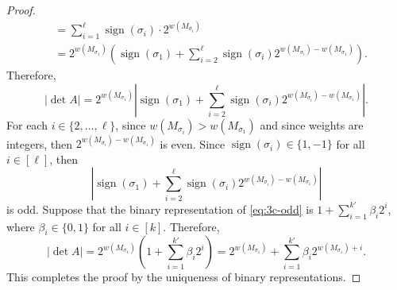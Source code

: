 \documentclass[letterpaper, reqno,11pt]{article}
\DeclareMathOperator{\sign}{sign}
\begin{document}
\begin{enumerate}
\begin{enumerate}
\begin{proof}
\begin{align*}
        &= \sum_{i = 1}^\ell \sign\left(\sigma_i\right) \cdot 2^{w\left(M_{\sigma_i}\right)} \\
        &= 2^{w\left(M_{\sigma_1}\right)} \left(\sign\left(\sigma_1\right) + \sum_{i = 2}^\ell \sign\left(\sigma_i\right) 2^{w\left(M_{\sigma_i}\right) - w\left(M_{\sigma_1}\right)}\right).
      \end{align*}
      Therefore,
      $$ |\det A| = 2^{w\left(M_{\sigma_1}\right)} \left|\sign\left(\sigma_1\right) + \sum_{i = 2}^\ell \sign\left(\sigma_i\right) 2^{w\left(M_{\sigma_i}\right) - w\left(M_{\sigma_1}\right)}\right|. $$
      For each $i \in \{ 2, \ldots, \ell \}$, since $w(M_{\sigma_i}) > w(M_{\sigma_1})$ and since weights are integers, then $2^{w(M_{\sigma_i}) - w(M_{\sigma_1})}$ is even. Since $\sign(\sigma_i) \in \{ 1, -1 \}$ for all $i \in [\ell]$, then
      \begin{equation} \label{eq:3c-odd}
        \left|\sign\left(\sigma_1\right) + \sum_{i = 2}^\ell \sign\left(\sigma_i\right) 2^{w\left(M_{\sigma_i}\right) - w\left(M_{\sigma_1}\right)}\right|
      \end{equation}
      is odd. Suppose that the binary representation of \eqref{eq:3c-odd} is $1 + \sum_{i = 1}^{k'} \beta_i 2^i$, where $\beta_i \in \{ 0, 1 \}$ for all $i \in [k]$. Therefore,
      $$ |\det A| = 2^{w\left(M_{\sigma_1}\right)} \left(1 + \sum_{i = 1}^{k'} \beta_i 2^i\right) = 2^{w\left(M_{\sigma_1}\right)} + \sum_{i = 1}^{k'} \beta_i 2^{w\left(M_{\sigma_1}\right) + i}. $$
      This completes the proof by the uniqueness of binary representations.
    \end{proof}
  \end{enumerate}
\end{enumerate}
\end{document}
